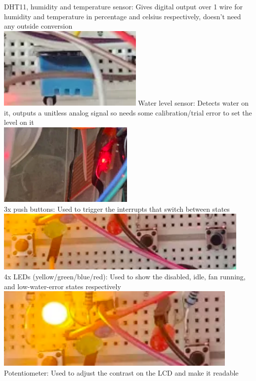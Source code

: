 \documentclass{article}
\begin{document}
DHT11, humidity and temperature sensor: Gives digital output over 1 wire for humidity and temperature in percentage and celsius respectively, doesn't need any outside conversion\\
\includegraphics[height=40mm]{humidtemp.png}\newpage
Water level sensor: Detects water on it, outputs a unitless analog signal so needs some calibration/trial error to set the level on it\\
\includegraphics[height=40mm]{waterlevel.png}\\
3x push buttons: Used to trigger the interrupts that switch between states\\
\includegraphics[height=30mm]{pushbutton.png}\\
4x LEDs (yellow/green/blue/red): Used to show the disabled, idle, fan running, and low-water-error states respectively\\
\includegraphics[height=40mm]{leds.png}\\
Potentiometer: Used to adjust the contrast on the LCD and make it readable\\
\end{document}
